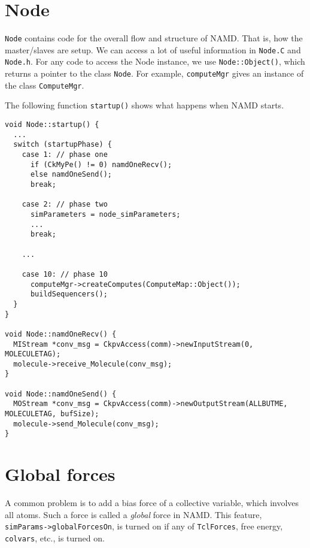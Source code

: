 \documentclass{article}
\begin{document}
\section{Node}

\texttt{Node} contains code for
the overall flow and structure of NAMD.
%
That is, how the master/slaves are setup.
%
We can access a lot of useful information
in \texttt{Node.C} and \texttt{Node.h}.
%
For any code to access the Node instance,
we use \texttt{Node::Object()},
which returns a pointer to the class \texttt{Node}.
%
For example,
\texttt{computeMgr}
gives an instance of the class \texttt{ComputeMgr}.

The following function \texttt{startup()}
shows what happens when NAMD starts.

\begin{lstlisting}
void Node::startup() {
  ...
  switch (startupPhase) {
    case 1: // phase one
      if (CkMyPe() != 0) namdOneRecv();
      else namdOneSend();
      break;

    case 2: // phase two
      simParameters = node_simParameters;
      ...
      break;

    ...

    case 10: // phase 10
      computeMgr->createComputes(ComputeMap::Object());
      buildSequencers();
  }
}

void Node::namdOneRecv() {
  MIStream *conv_msg = CkpvAccess(comm)->newInputStream(0, MOLECULETAG);
  molecule->receive_Molecule(conv_msg);
}

void Node::namdOneSend() {
  MOStream *conv_msg = CkpvAccess(comm)->newOutputStream(ALLBUTME, MOLECULETAG, bufSize);
  molecule->send_Molecule(conv_msg);
}

\end{lstlisting}


\section{\label{globalforce}Global forces}


A common problem is to add a bias force of a collective variable,
which involves all atoms.
%
Such a force is called a \emph{global} force in NAMD.
%
This feature, \texttt{simParams->globalForcesOn}, is turned on if any of
\texttt{TclForces}, free energy, \texttt{colvars}, etc.,
is turned on.
\end{document}
